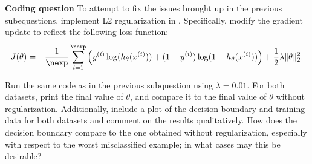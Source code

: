 \item {} \textbf{Coding question}
To attempt to fix the issues brought up in the previous subequestions, implement L2 regularization in . Specifically, modify the gradient update to reflect the following loss function:
\begin{equation}
J(\theta)
	= -\frac{1}{\nexp} \sum_{i=1}^\nexp \left(y^{(i)}\log(h_{\theta}(x^{(i)}))
		+  (1 - y^{(i)})\log(1 - h_{\theta}(x^{(i)}))\right) + \frac{1}{2} \lambda \|\theta\|_2^2.
\end{equation}

Run the same code as in the previous subquestion using $\lambda = 0.01$. For both datasets, print the final value of $\theta$, and compare it to the final value of $\theta$ without regularization. Additionally, include a plot of the decision boundary and training data for both datasets and comment on the results qualitatively. How does the decision boundary compare to the one obtained without regularization, especially with respect to the worst misclassified example; in what cases may this be desirable?